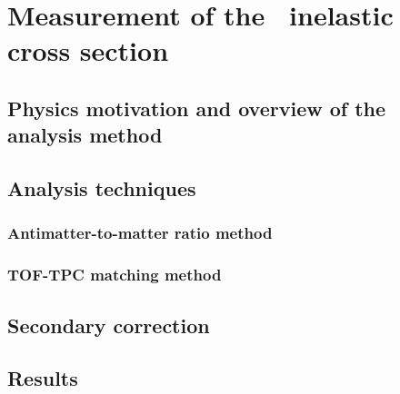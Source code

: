 \section{Measurement of the \ahe\ inelastic cross section}\label{sec:ResHe3SigmaInel}
\subsection{Physics motivation and overview of the analysis method}
\subsection{Analysis techniques}
\subsubsection{Antimatter-to-matter ratio method}
\subsubsection{TOF-TPC matching method}
\subsection{Secondary correction}
\subsection{Results}

